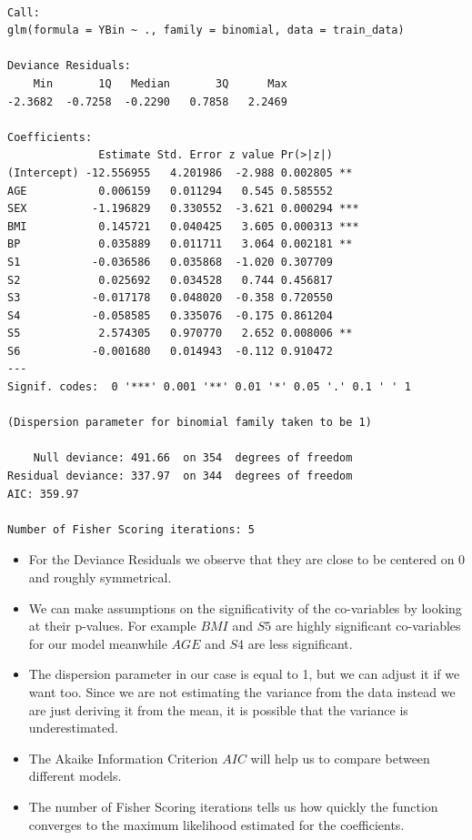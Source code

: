 \documentclass[
]{article}
\begin{document}
\begin{verbatim}

Call:
glm(formula = YBin ~ ., family = binomial, data = train_data)

Deviance Residuals: 
    Min       1Q   Median       3Q      Max  
-2.3682  -0.7258  -0.2290   0.7858   2.2469  

Coefficients:
              Estimate Std. Error z value Pr(>|z|)    
(Intercept) -12.556955   4.201986  -2.988 0.002805 ** 
AGE           0.006159   0.011294   0.545 0.585552    
SEX          -1.196829   0.330552  -3.621 0.000294 ***
BMI           0.145721   0.040425   3.605 0.000313 ***
BP            0.035889   0.011711   3.064 0.002181 ** 
S1           -0.036586   0.035868  -1.020 0.307709    
S2            0.025692   0.034528   0.744 0.456817    
S3           -0.017178   0.048020  -0.358 0.720550    
S4           -0.058585   0.335076  -0.175 0.861204    
S5            2.574305   0.970770   2.652 0.008006 ** 
S6           -0.001680   0.014943  -0.112 0.910472    
---
Signif. codes:  0 '***' 0.001 '**' 0.01 '*' 0.05 '.' 0.1 ' ' 1

(Dispersion parameter for binomial family taken to be 1)

    Null deviance: 491.66  on 354  degrees of freedom
Residual deviance: 337.97  on 344  degrees of freedom
AIC: 359.97

Number of Fisher Scoring iterations: 5
\end{verbatim}

\begin{itemize}
\item
  For the Deviance Residuals we observe that they are close to be
  centered on 0 and roughly symmetrical.
\item
  We can make assumptions on the significativity of the co-variables by
  looking at their p-values. For example \(BMI\) and \(S5\) are highly
  significant co-variables for our model meanwhile \(AGE\) and \(S4\)
  are less significant.
\item
  The dispersion parameter in our case is equal to 1, but we can adjust
  it if we want too. Since we are not estimating the variance from the
  data instead we are just deriving it from the mean, it is possible
  that the variance is underestimated.
\item
  The Akaike Information Criterion \(AIC\) will help us to compare
  between different models.
\item
  The number of Fisher Scoring iterations tells us how quickly the
  function converges to the maximum likelihood estimated for the
  coefficients.
\end{itemize}
\end{document}

